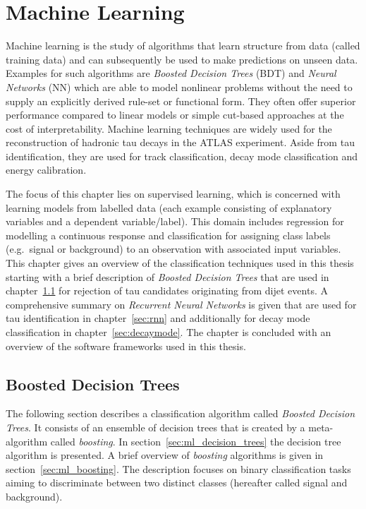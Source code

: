 \chapter{Machine Learning}
\label{sec:ml}

Machine learning is the study of algorithms that learn structure from data
(called training data) and can subsequently be used to make predictions on
unseen data. Examples for such algorithms are \emph{Boosted Decision Trees}
(BDT) and \emph{Neural Networks} (NN) which are able to model nonlinear problems
without the need to supply an explicitly derived rule-set or functional form.
They often offer superior performance compared to linear models or simple
cut-based approaches at the cost of interpretability. Machine learning
techniques are widely used for the reconstruction of hadronic tau decays in the
ATLAS experiment. Aside from tau identification, they are used for track
classification, decay mode classification and energy calibration.

The focus of this chapter lies on supervised learning, which is concerned with
learning models from labelled data (each example consisting of explanatory
variables and a dependent variable/label). This domain includes regression for
modelling a continuous response and classification for assigning class labels
(e.g.\ signal or background) to an observation with associated input variables.
This chapter gives an overview of the classification techniques used in this
thesis starting with a brief description of \emph{Boosted Decision Trees} that
are used in chapter~\ref{sec:bdt} for rejection of tau candidates originating
from dijet events. A comprehensive summary on \emph{Recurrent Neural Networks}
is given that are used for tau identification in chapter~\ref{sec:rnn} and
additionally for decay mode classification in chapter~\ref{sec:decaymode}. The
chapter is concluded with an overview of the software frameworks used in this
thesis.

\section{Boosted Decision Trees}
\label{sec:bdt}

The following section describes a classification algorithm called \emph{Boosted
  Decision Trees}. It consists of an ensemble of decision trees that is created
by a meta-algorithm called \emph{boosting}. In
section~\ref{sec:ml_decision_trees} the decision tree algorithm is presented. A
brief overview of \emph{boosting} algorithms is given in
section~\ref{sec:ml_boosting}. The description focuses on binary classification
tasks aiming to discriminate between two distinct classes (hereafter called
signal and background).

